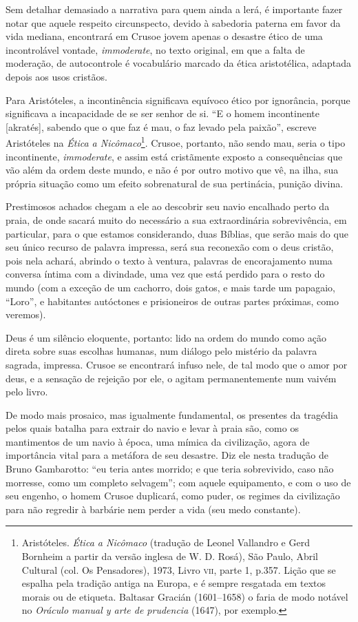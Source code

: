 Sem detalhar demasiado a narrativa para quem ainda a lerá, é importante
fazer notar que aquele respeito circunspecto, devido à sabedoria paterna
em favor da vida mediana, encontrará em Crusoe jovem apenas o desastre
ético de uma incontrolável vontade, \emph{immoderate}, no texto
original, em que a falta de moderação, de autocontrole é vocabulário
marcado da ética aristotélica, adaptada depois aos usos cristãos.

Para Aristóteles, a incontinência significava equívoco ético por
ignorância, porque significava a incapacidade de se ser senhor de si.
``E o homem incontinente {[}akratés{]}, sabendo que o que faz é mau, o
faz levado pela paixão'', escreve Aristóteles na \emph{Ética a
Nicômaco}\footnote{Aristóteles. \emph{Ética a Nicômaco} (tradução de
  Leonel Vallandro e Gerd Bornheim a partir da versão inglesa de W. D.
  Rosá), São Paulo, Abril Cultural (col. Os Pensadores), 1973, Livro
  \textsc{vii}, parte 1, p.357. Lição que se espalha pela tradição antiga na
  Europa, e é sempre resgatada em textos morais ou de etiqueta. Baltasar
  Gracián (1601--1658) o faria de modo notável no \emph{Oráculo manual y
  arte de prudencia} (1647), por exemplo.}. Crusoe, portanto, não sendo
mau, seria o tipo incontinente, \emph{immoderate}, e assim está
cristãmente exposto a consequências que vão além da ordem deste mundo, e
não é por outro motivo que vê, na ilha, sua própria situação como um
efeito sobrenatural de sua pertinácia, punição divina.

Prestimosos achados chegam a ele ao descobrir seu navio encalhado perto
da praia, de onde sacará muito do necessário a sua extraordinária
sobrevivência, em particular, para o que estamos considerando, duas
Bíblias, que serão mais do que seu único recurso de palavra impressa,
será sua reconexão com o deus cristão, pois nela achará, abrindo o texto
à ventura, palavras de encorajamento numa conversa íntima com a
divindade, uma vez que está perdido para o resto do mundo (com a exceção
de um cachorro, dois gatos, e mais tarde um papagaio, ``Loro'', e
habitantes autóctones e prisioneiros de outras partes próximas, como
veremos).

Deus é um silêncio eloquente, portanto: lido na ordem do mundo como ação
direta sobre suas escolhas humanas, num diálogo pelo mistério da palavra
sagrada, impressa. Crusoe se encontrará infuso nele, de tal modo que o
amor por deus, e a sensação de rejeição por ele, o agitam
permanentemente num vaivém pelo livro.

De modo mais prosaico, mas igualmente fundamental, os presentes da
tragédia pelos quais batalha para extrair do navio e levar à praia são,
como os mantimentos de um navio à época, uma mímica da civilização,
agora de importância vital para a metáfora de seu desastre. Diz ele
nesta tradução de Bruno Gambarotto: ``eu teria antes morrido; e que
teria sobrevivido, caso não morresse, como um completo selvagem''; com
aquele equipamento, e com o uso de seu engenho, o homem Crusoe
duplicará, como puder, os regimes da civilização para não regredir à
barbárie nem perder a vida (seu medo constante).

